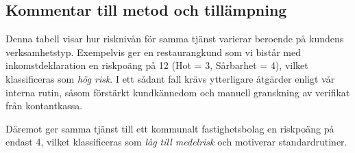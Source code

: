 \documentclass{article}
\begin{document}
\vspace{1em}

\subsection*{Kommentar till metod och tillämpning}

Denna tabell visar hur risknivån för samma tjänst varierar beroende på kundens verksamhetstyp. Exempelvis ger en restaurangkund som vi bistår med inkomstdeklaration en riskpoäng på 12 (Hot = 3, Sårbarhet = 4), vilket klassificeras som \textit{hög risk}. I ett sådant fall krävs ytterligare åtgärder enligt vår interna rutin, såsom förstärkt kundkännedom och manuell granskning av verifikat från kontantkassa.

Däremot ger samma tjänst till ett kommunalt fastighetsbolag en riskpoäng på endast 4, vilket klassificeras som \textit{låg till medelrisk} och motiverar standardrutiner.
\end{document}

